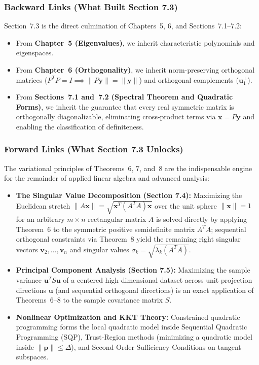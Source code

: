 \documentclass[11pt, letterpaper]{article}
\theoremstyle{definition}
\theoremstyle{remark}
\begin{document}
\subsubsection*{Backward Links (What Built Section 7.3)}
Section~7.3 is the direct culmination of Chapters~5, 6, and Sections~7.1–7.2:
\begin{itemize}
    \item From \textbf{Chapter~5 (Eigenvalues)}, we inherit characteristic polynomials and eigenspaces.
    \item From \textbf{Chapter~6 (Orthogonality)}, we inherit norm-preserving orthogonal matrices ($P^T P = I \implies \|P\mathbf{y}\| = \|\mathbf{y}\|$) and orthogonal complements ($\mathbf{u}_1^\perp$).
    \item From \textbf{Sections~7.1 and~7.2 (Spectral Theorem and Quadratic Forms)}, we inherit the guarantee that every real symmetric matrix is orthogonally diagonalizable, eliminating cross-product terms via $\mathbf{x} = P\mathbf{y}$ and enabling the classification of definiteness.
\end{itemize}

\subsubsection*{Forward Links (What Section 7.3 Unlocks)}
The variational principles of Theorems~6, 7, and~8 are the indispensable engine for the remainder of applied linear algebra and advanced analysis:
\begin{itemize}
    \item \textbf{The Singular Value Decomposition (Section 7.4):} Maximizing the Euclidean stretch $\|A\mathbf{x}\| = \sqrt{\mathbf{x}^T (A^T A)\mathbf{x}}$ over the unit sphere $\|\mathbf{x}\| = 1$ for an arbitrary $m \times n$ rectangular matrix $A$ is solved directly by applying Theorem~6 to the symmetric positive semidefinite matrix $A^T A$; sequential orthogonal constraints via Theorem~8 yield the remaining right singular vectors $\mathbf{v}_2, \dots, \mathbf{v}_n$ and singular values $\sigma_k = \sqrt{\lambda_k(A^T A)}$.
    \item \textbf{Principal Component Analysis (Section 7.5):} Maximizing the sample variance $\mathbf{u}^T S \mathbf{u}$ of a centered high-dimensional dataset across unit projection directions $\mathbf{u}$ (and sequential orthogonal directions) is an exact application of Theorems~6–8 to the sample covariance matrix $S$.
    \item \textbf{Nonlinear Optimization and KKT Theory:} Constrained quadratic programming forms the local quadratic model inside Sequential Quadratic Programming (SQP), Trust-Region methods (minimizing a quadratic model inside $\|\mathbf{p}\| \le \Delta$), and Second-Order Sufficiency Conditions on tangent subspaces.
\end{itemize}
\end{document}
